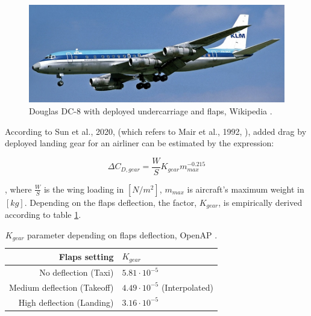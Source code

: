 \documentclass[english]{kththesis}
\begin{document}
\begin{figure}[hb]
    \centering
    \includegraphics[width=1\textwidth]{Epictures/Undercarriage_Flaps_Douglas_DC-8-55CF.jpg}
    \caption{Douglas DC-8 with deployed undercarriage and flaps, Wikipedia \cite{WikipediaDC8}.}
    \label{fig:DC8Gear}
\end{figure}


According to Sun et al., 2020, \cite{Sun2020} (which refers to Mair et al., 1992, \cite{Mair1992}), added drag by deployed landing gear for an airliner can be estimated by the expression:

\begin{equation}
\label{eq:OpenAPGearDrag}
\Delta C_{D,gear} = \frac{W}{S} K_{gear} m_{max}^{-0.215}
\end{equation}

, where $\frac{W}{S}$ is the wing loading in $[N/m^2]$, $m_{max}$ is aircraft's maximum weight in $[kg]$. Depending on the flaps deflection, the factor, $K_{gear}$, is empirically derived according to table \ref{table:Kgear}.

\begin{table}[h!]
\centering
\caption{$K_{gear}$ parameter depending on flaps deflection, OpenAP \cite{Sun2020}.}
\begin{tabular}{ r | l } 
\hline
Flaps setting & $K_{gear}$ \\
\hline
No deflection (Taxi) &  $5.81 \cdot 10^{-5}$\\
Medium deflection (Takeoff)  & $4.49 \cdot 10^{-5}$ (Interpolated)\\
High deflection (Landing) & $3.16 \cdot 10^{-5}$\\
\hline
\end{tabular}
\label{table:Kgear}
\end{table}
\end{document}
